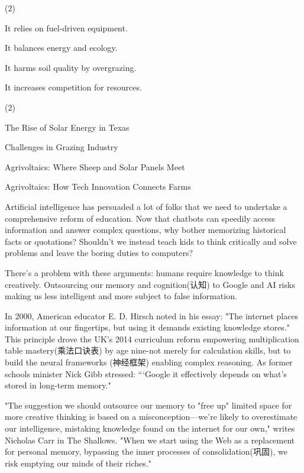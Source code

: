 \documentclass{英语试卷}
\begin{document}
\begin{choices}(2)
  \item It relies on fuel-driven equipment.
  \item It balances energy and ecology.
  \item It harms soil quality by overgrazing.
  \item It increases competition for resources.
\end{choices}
\begin{choices}(2)
  \item The Rise of Solar Energy in Texas
  \item Challenges in Grazing Industry
  \item Agrivoltaics: Where Sheep and Solar Panels Meet
  \item Agrivoltaics: How Tech Innovation Connects Farms
\end{choices}
\par Artificial intelligence has persuaded a lot of folks that we need to undertake a comprehensive reform of education. Now that chatbots can speedily access information and answer complex questions, why bother memorizing historical facts or quotations? Shouldn't we instead teach kids to think critically and solve problems and leave the boring duties to computers?\par
\par There's a problem with these arguments: humans require knowledge to think creatively. Outsourcing our memory and cognition(认知) to Google and AI risks making us less intelligent and more subject to false information.\par
\par In 2000, American educator E. D. Hirsch noted in his essay: "The internet places information at our fingertips, but using it demands existing knowledge stores." This principle drove the UK's 2014 curriculum reform empowering multiplication table mastery(乘法口诀表) by age nine-not merely for calculation skills, but to build the neural frameworks (神经框架) enabling complex reasoning. As former schools minister Nick Gibb stressed: “‘Google it effectively depends on what’s stored in long-term memory."\par
\par "The suggestion we should outsource our memory to "free up" limited space for more creative thinking is based on a misconception—we're likely to overestimate our intelligence, mistaking knowledge found on the internet for our own," writes Nicholas Carr in The Shallows. "When we start using the Web as a replacement for personal memory, bypassing the inner processes of consolidation(巩固), we risk emptying our minds of their riches."\par
\end{document}
